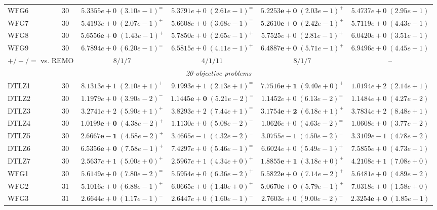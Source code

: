 \begin{table}[tp]
\begin{tabular*}{\textwidth}{@{\extracolsep{\fill}}lccccc@{}}
WFG6 & 30 & $5.3355e+0\;(3.10e-1)^{=}$ & $5.3791e+0\;(2.61e-1)^{=}$ & $\mathbf{5.2253e+0}\;(2.03e-1)^{+}$ & $5.4737e+0\;(2.95e-1)$ \\
WFG7 & 30 & $5.4193e+0\;(2.07e-1)^{+}$ & $5.6608e+0\;(3.68e-1)^{=}$ & $\mathbf{5.2610e+0}\;(2.42e-1)^{+}$ & $5.7119e+0\;(4.43e-1)$ \\
WFG8 & 30 & $\mathbf{5.6556e+0}\;(1.43e-1)^{+}$ & $5.7850e+0\;(2.65e-1)^{+}$ & $5.7525e+0\;(2.81e-1)^{+}$ & $6.0420e+0\;(3.51e-1)$ \\
WFG9 & 30 & $6.7894e+0\;(6.20e-1)^{=}$ & $6.5815e+0\;(4.11e-1)^{+}$ & $\mathbf{6.4887e+0}\;(5.71e-1)^{+}$ & $6.9496e+0\;(4.45e-1)$ \\
\midrule
\multicolumn{2}{l}{$+/-/=$ vs. REMO} & $8/1/7$ & $4/1/11$ & $8/1/7$ & -- \\
\midrule
\multicolumn{6}{c}{\textit{20-objective problems}} \\
\midrule
DTLZ1 & 30 & $8.1313e+1\;(2.10e+1)^{+}$ & $9.1993e+1\;(2.13e+1)^{=}$ & $\mathbf{7.7516e+1}\;(9.40e+0)^{+}$ & $1.0194e+2\;(2.14e+1)$ \\
DTLZ2 & 30 & $1.1979e+0\;(3.90e-2)^{-}$ & $\mathbf{1.1445e+0}\;(5.21e-2)^{=}$ & $1.1452e+0\;(6.13e-2)^{=}$ & $1.1484e+0\;(4.27e-2)$ \\
DTLZ3 & 30 & $3.2741e+2\;(5.90e+1)^{+}$ & $3.8293e+2\;(7.44e+1)^{=}$ & $\mathbf{3.1754e+2}\;(6.18e+1)^{+}$ & $3.7834e+2\;(8.48e+1)$ \\
DTLZ4 & 30 & $\mathbf{1.0199e+0}\;(4.38e-2)^{+}$ & $1.1130e+0\;(5.08e-2)^{-}$ & $1.0626e+0\;(4.63e-2)^{=}$ & $1.0608e+0\;(3.77e-2)$ \\
DTLZ5 & 30 & $\mathbf{2.6667e-1}\;(4.58e-2)^{+}$ & $3.4665e-1\;(4.32e-2)^{=}$ & $3.0755e-1\;(4.50e-2)^{=}$ & $3.3109e-1\;(4.78e-2)$ \\
DTLZ6 & 30 & $\mathbf{6.5356e+0}\;(7.58e-1)^{+}$ & $7.4297e+0\;(5.46e-1)^{=}$ & $6.6024e+0\;(5.49e-1)^{+}$ & $7.5855e+0\;(4.73e-1)$ \\
DTLZ7 & 30 & $2.5637e+1\;(5.00e+0)^{+}$ & $2.5967e+1\;(4.34e+0)^{+}$ & $\mathbf{1.8855e+1}\;(3.18e+0)^{+}$ & $4.2108e+1\;(7.08e+0)$ \\
WFG1 & 30 & $5.6149e+0\;(7.80e-2)^{=}$ & $5.5954e+0\;(6.36e-2)^{+}$ & $\mathbf{5.5822e+0}\;(7.14e-2)^{+}$ & $5.6481e+0\;(4.89e-2)$ \\
WFG2 & 31 & $5.1016e+0\;(6.88e-1)^{+}$ & $6.0665e+0\;(1.40e+0)^{+}$ & $\mathbf{5.0670e+0}\;(5.79e-1)^{+}$ & $7.0318e+0\;(1.58e+0)$ \\
WFG3 & 31 & $2.6644e+0\;(1.17e-1)^{-}$ & $2.6447e+0\;(1.60e-1)^{-}$ & $2.7603e+0\;(9.00e-2)^{-}$ & $\mathbf{2.3254e+0}\;(1.85e-1)$ \\

\end{tabular*}
\end{table}
